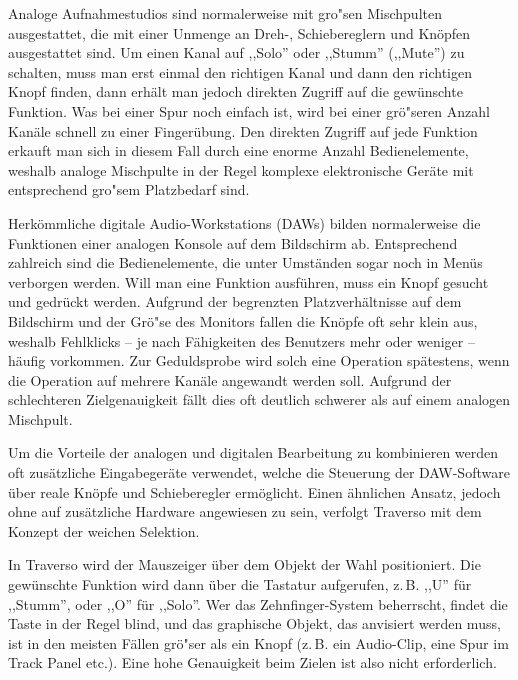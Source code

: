 Analoge Aufnahmestudios sind normalerweise mit gro"sen Mischpulten ausgestattet, die mit einer Unmenge an Dreh-, Schiebereglern und Knöpfen ausgestattet sind. Um einen Kanal auf ,,Solo'' oder ,,Stumm'' (,,Mute'') zu schalten, muss man erst einmal den richtigen Kanal und dann den richtigen Knopf finden, dann erhält man jedoch direkten Zugriff auf die gewünschte Funktion. Was bei einer Spur noch einfach ist, wird bei einer grö"seren Anzahl Kanäle schnell zu einer Fingerübung. Den direkten Zugriff auf jede Funktion erkauft man sich in diesem Fall durch eine enorme Anzahl Bedienelemente, weshalb analoge Mischpulte in der Regel komplexe elektronische Geräte mit entsprechend gro"sem Platzbedarf sind.

Herkömmliche digitale Audio-Workstations (DAWs) bilden normalerweise die Funktionen einer analogen Konsole auf dem Bildschirm ab. Entsprechend zahlreich sind die Bedienelemente, die unter Umständen sogar noch in Menüs verborgen werden. Will man eine Funktion ausführen, muss ein Knopf gesucht und gedrückt werden. Aufgrund der begrenzten Platzverhältnisse auf dem Bildschirm und der Grö"se des Monitors fallen die Knöpfe oft sehr klein aus, weshalb Fehlklicks -- je nach Fähigkeiten des Benutzers mehr oder weniger -- häufig vorkommen. Zur Geduldsprobe wird solch eine Operation spätestens, wenn die Operation auf mehrere Kanäle angewandt werden soll. Aufgrund der schlechteren Zielgenauigkeit fällt dies oft deutlich schwerer als auf einem analogen Mischpult.

Um die Vorteile der analogen und digitalen Bearbeitung zu kombinieren werden oft zusätzliche Eingabegeräte verwendet, welche die Steuerung der DAW-Software über reale Knöpfe und Schieberegler ermöglicht. Einen ähnlichen Ansatz, jedoch ohne auf zusätzliche Hardware angewiesen zu sein, verfolgt Traverso mit dem Konzept der weichen Selektion.

In Traverso wird der Mauszeiger über dem Objekt der Wahl positioniert. Die gewünschte Funktion wird dann über die Tastatur aufgerufen, z.\,B. ,,U'' für ,,Stumm'', oder ,,O'' für ,,Solo''. Wer das Zehnfinger-System beherrscht, findet die Taste in der Regel blind, und das graphische Objekt, das anvisiert werden muss, ist in den meisten Fällen grö"ser als ein Knopf (z.\,B. ein Audio-Clip, eine Spur im Track Panel etc.). Eine hohe Genauigkeit beim Zielen ist also nicht erforderlich.

